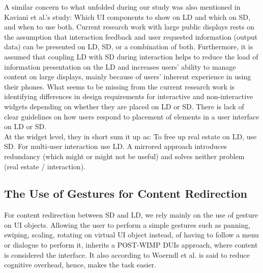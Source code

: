 A similar concern to what unfolded during our study was also mentioned in
Kaviani et al.'s study: Which UI components to show on LD and which on SD, and
when to use both. Current research work with large public displays rests on the
assumption that interaction feedback and user requested information (output data) can be presented on LD, SD, or a combination of both. Furthermore, it is assumed that
coupling LD with SD during interaction helps to reduce the load of information
presentation on the LD and increases users’ ability to manage content on large
displays, mainly because of users’ inherent experience in using their phones. What seems to be missing from the current research work is identifying differences in design requirements for interactive and non-interactive widgets depending on whether they are placed on LD or SD. There is lack of clear guidelines on how users respond to placement of elements in a user interface on LD or SD.\\ At the widget level, they in short sum it up as: To free up real estate on LD,
use SD. For multi-user interaction use LD. A mirrored approach introduces
redundancy (which might or might not be useful) and solves neither problem
(real estate / interaction).\\

\subsection{The Use of Gestures for Content Redirection}
For content redirection between SD and LD, we rely mainly on the use of
gesture on UI objects. Allowing the user to perform a simple gestures such as
panning, swiping, scaling, rotating on virtual UI object instead, of having to
follow a menu or dialogue to perform it, inherits a POST-WIMP DUIs
approach, where content is considered the interface. It also according to 
Woerndl et al. \cite{woerndl2012combining} is said to reduce cognitive overhead, hence, makes the task easier.

